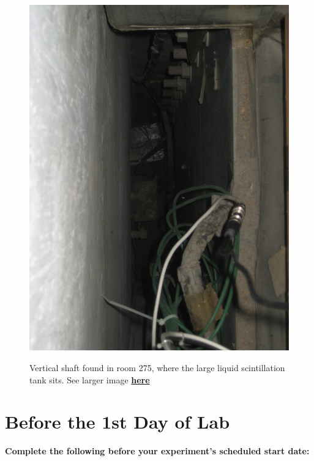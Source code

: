 \documentclass{../lab}
\begin{document}
\begin{figure}[h]
\begin{minipage}{0.24\textwidth}
    \href{http://experimentationlab.berkeley.edu/sites/default/files/images/MUO_Tank_3565.jpg}{\includegraphics[width=\linewidth,keepaspectratio]{images/MUO_Tank_3565.jpg}}
    \caption{Vertical shaft found in room 275, where the large liquid scintillation tank sits. See larger image \href{http://experimentationlab.berkeley.edu/sites/default/files/images/MUO_Tank_3565.jpg}{\textbf{here}}}
\end{minipage}
\end{figure}

\section{Before the 1st Day of Lab}

\textbf{Complete the following before your experiment's scheduled start date:}

\newpage
\end{document}
